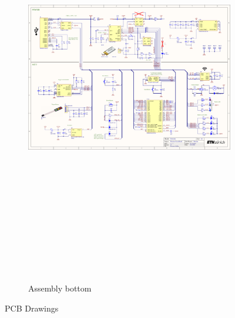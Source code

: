 \begin{figure}[H]
\begin{subfigure}{0.24\textwidth}
{\includegraphics[height=17.5cm, page=4]{../../5_Hardware/WSBR_Board/Project Outputs for WSBR_Board/WSBR_Board.PDF}}
\caption{Assembly bottom}
\end{subfigure}
\caption{PCB Drawings}
\label{fig:PCB Drawings}
\end{figure}
\newpage


